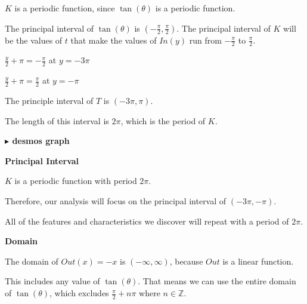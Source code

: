 \documentclass{ximera}
\begin{document}
$K$ is a periodic function, since $\tan(\theta)$ is a periodic function. 

The principal interval of $\tan(\theta)$ is $\left( -\frac{\pi}{2}, \frac{\pi}{2}  \right)$.  The principal interval of $K$ will be the values of $t$ that make the values of $In(y)$ run from $-\frac{\pi}{2}$ to $\frac{\pi}{2}$. 


$\frac{y}{2} + \pi = -\frac{\pi}{2}$ at $y = -3\pi$

$\frac{y}{2} + \pi = \frac{\pi}{2}$ at $y = -\pi$

The principle interval of $T$ is $\left( -3\pi, \pi \right)$. 

The length of this interval is $2\pi$, which is the period of $K$. 












\textbf{\textcolor{blue!55!black}{$\blacktriangleright$ desmos graph}} 
\begin{center}
\end{center}











\begin{observation} \textbf{\textcolor{-red!75}{Principal Interval}}

$K$ is a periodic function with period $2\pi$. 


Therefore, our analysis will focus on the principal interval of $\left( -3\pi, -\pi \right)$. 


All of the features and characteristics we discover will repeat with a period of $2\pi$.


\end{observation}









\textbf{\textcolor{blue!55!black}{Domain}}


The domain of $Out(x) = -x$ is $(-\infty, \infty)$, because $Out$ is a linear function.  

This includes any value of $\tan(\theta)$. That means we can use the entire domain of $\tan(\theta)$, which excludes $\frac{\pi}{2} + n \pi$ where $n \in \mathbb{Z}$. 
\end{document}
